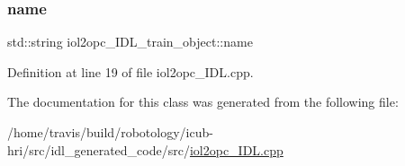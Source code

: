 \subsubsection{\texorpdfstring{name}{name}}
{\footnotesize\ttfamily std\+::string iol2opc\+\_\+\+I\+D\+L\+\_\+train\+\_\+object\+::name}



Definition at line 19 of file iol2opc\+\_\+\+I\+D\+L.\+cpp.



The documentation for this class was generated from the following file\+:\begin{DoxyCompactItemize}
\item 
/home/travis/build/robotology/icub-\/hri/src/idl\+\_\+generated\+\_\+code/src/\hyperlink{iol2opc__IDL_8cpp}{iol2opc\+\_\+\+I\+D\+L.\+cpp}\end{DoxyCompactItemize}
